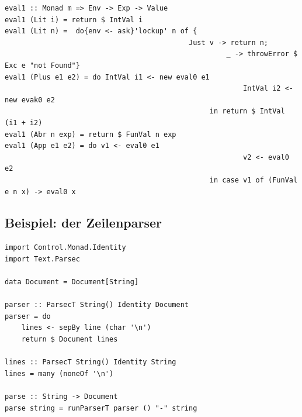\documentclass[ngerman,a4paper]{report}
\begin{document}
\begin{lstlisting}
eval1 :: Monad m => Env -> Exp -> Value
eval1 (Lit i) = return $ IntVal i
eval1 (Lit n) =  do{env <- ask}'lockup' n of {
											Just v -> return n; 
													 _ -> throwError $ Exc e "not Found"}
eval1 (Plus e1 e2) = do IntVal i1 <- new eval0 e1
														 IntVal i2 <- new evak0 e2
												 in return $ IntVal (i1 + i2)
eval1 (Abr n exp) = return $ FunVal n exp
eval1 (App e1 e2) = do v1 <- eval0 e1
														 v2 <- eval0 e2
												 in case v1 of (FunVal e n x) -> eval0 x				
\end{lstlisting}

\subsection{Beispiel: der Zeilenparser}
\begin{lstlisting}
import Control.Monad.Identity
import Text.Parsec

data Document = Document[String]

parser :: ParsecT String() Identity Document
parser = do
	lines <- sepBy line (char '\n')
	return $ Document lines

lines :: ParsecT String() Identity String
lines = many (noneOf '\n')

parse :: String -> Document
parse string = runParserT parser () "-" string
\end{lstlisting}
\end{document}
